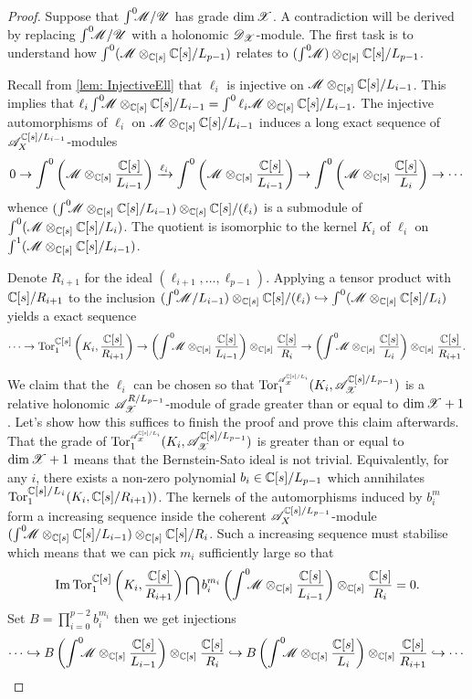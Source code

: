 \begin{proof}
  Suppose that $\int^0 \mkern -8mu\mathscr{M}/\mathscr{U}$ has grade $\dim \mathscr{X}$.
  A contradiction will be derived by replacing $\int^0 \mkern -8mu\mathscr{M}/\mathscr{U}$ with a holonomic $\mathscr{D}_{\mathscr{X}}$-module.
  The first task is to understand how $\int^0(\mathscr{M}\otimes_{\mathbb{C}[s]}\mathbb{C}[s]/L_{p-1})$ relates to $(\int^0 \mkern -8mu\mathscr{M})\otimes_{\mathbb{C}[s]}\mathbb{C}[s]/L_{p-1}$.

  Recall from \cref{lem: InjectiveEll} that $\ell_{i}$ is injective on $\mathscr{M} \otimes_{\mathbb{C}[s]} \mathbb{C}[s]/L_{i-1}$. This implies that
  $\ell_{i}\int^0 \mkern -8mu \mathscr{M} \otimes_{\mathbb{C}[s]} \mathbb{C}[s]/L_{i-1} = \int^0 \ell_{i}\mathscr{M}\otimes_{\mathbb{C}[s]} \mathbb{C}[s]/L_{i-1}.$
  The injective automorphisms of $\ell_i$ on $\mathscr{M} \otimes_{\mathbb{C}[s]} \mathbb{C}[s]/L_{i-1}$ induces a long exact sequence of $\mathscr{A}_X^{\mathbb{C}[s]/L_{i-1}}$-modules
  $$0 \to \int^0\left(\mathscr{M} \otimes_{\mathbb{C}[s]} \frac{\mathbb{C}[s]}{L_{i-1}}\right) \xrightarrow{\ell_i} \int^0 \left(\mathscr{M} \otimes_{\mathbb{C}[s]} \frac{\mathbb{C}[s]}{L_{i-1}}\right) \to \int^0\left(\mathscr{M} \otimes_{\mathbb{C}[s]} \frac{\mathbb{C}[s]}{L_{i}}\right) \to \cdots $$
  whence $(\int^0 \mkern -8mu \mathscr{M}\otimes_{\mathbb{C}[s]} \mathbb{C}[s]/L_{i-1})\otimes_{\mathbb{C}[s]} \mathbb{C}[s]/(\ell_{i})$ is a submodule of $\int^0(\mathscr{M} \otimes_{\mathbb{C}[s]} \mathbb{C}[s]/L_{i})$.
  The quotient is isomorphic to the kernel $K_i$ of $\ell_i$ on $\int^1(\mathscr{M} \otimes_{\mathbb{C}[s]} \mathbb{C}[s]/L_{i-1})$.


  Denote $R_{i+1}$ for the ideal $(\ell_{i+1},\ldots,\ell_{p-1})$. Applying a tensor product with $\mathbb{C}[s]/R_{i+1}$ to the inclusion $(\int^0 \mkern -8mu \mathscr{M}/L_{i-1}) \otimes_{\mathbb{C}[s]}\mathbb{C}[s]/(\ell_i)\hookrightarrow \int^0(\mathscr{M}\otimes_{\mathbb{C}[s]}\mathbb{C}[s]/L_i)$ yields a exact sequence
  $$\cdots \to \Tr{\C[s]}{1}\left(K_i, \frac{\C[s]}{R_{i+1}}\right) \to \left(\Int \M\otimes_{\C[s]}\frac{\C[s]}{L_{i-1}}\right) \otimes_{\C[s]}\frac{\C[s]}{R_{i}} \to \left(\Int\M\otimes_{\C[s]}\frac{\C[s]}{L_i}\right)\otimes_{\C[s]}\frac{\C[s]}{R_{i+1}}.$$

  We claim that the $\ell_i$ can be chosen so that $\Tr{\A_\X^{\C[s]/L_i} }{1}(K_i, \A_\X^{\C[s]/L_{p-1}})$ is a relative holonomic $\mathscr{A}_{\mathscr{X}}^{R/L_{p-1}}$-module of grade greater than or equal to $\dim\mathscr{X}+1$.
  Let's show how this suffices to finish the proof and prove this claim afterwards. \\

  That the grade of $\Tr{\A_\X^{\C[s]/L_i} }{1}(K_i, \A_\X^{\C[s]/L_{p-1}})$ is greater than or equal to $\dim \mathscr{X}+1$ means that the Bernstein-Sato ideal is not trivial.
  Equivalently, for any $i$, there exists a non-zero polynomial $b_i\in \mathbb{C}[s]/L_{p-1}$ which annihilates $\Tr{\C[s]/L_{i}}{1}(K_i, \C[s]/R_{i+1} ))$.
  The kernels of the automorphisms induced by $b_i^m$ form a increasing sequence inside the coherent $\mathscr{A}_X^{\mathbb{C}[s]/L_{p-1}}$-module $(\int^0 \mkern -8mu \mathscr{M}\otimes_{\mathbb{C}[s]}\mathbb{C}[s]/L_{i-1})\otimes_{\mathbb{C}[s]}\mathbb{C}[s]/R_{i}$.
  Such a increasing sequence must stabilise which means that we can pick $m_i$ sufficiently large so that $$\img \Tr{\C[s]}{1}\left(K_i, \frac{\C[s]}{R_{i+1}}\right)\bigcap b_i^{m_i}\left(\Int \M\otimes_{\C[s]}\frac{\C[s]}{L_{i-1}}\right)\otimes_{\C[s]}\frac{\C[s]}{R_{i}} = 0.$$
  Set $B = \prod_{i=0}^{p-2} b_i^{m_i}$ then we get injections
  $$\cdots \hookrightarrow B \left(\int^0 \mkern -8mu \mathscr{M}\otimes_{\mathbb{C}[s]}\frac{\mathbb{C}[s]}{L_{i-1}}\right) \otimes_{\mathbb{C}[s]}\frac{\mathbb{C}[s]}{R_{i}} \hookrightarrow B\left(\int^0 \mkern -8mu\mathscr{M}\otimes_{\mathbb{C}[s]}\frac{\mathbb{C}[s]}{L_i}\right)\otimes_{\mathbb{C}[s]}\frac{\mathbb{C}[s]}{R_{i+1}}\hookrightarrow\cdots  $$



\end{proof}
